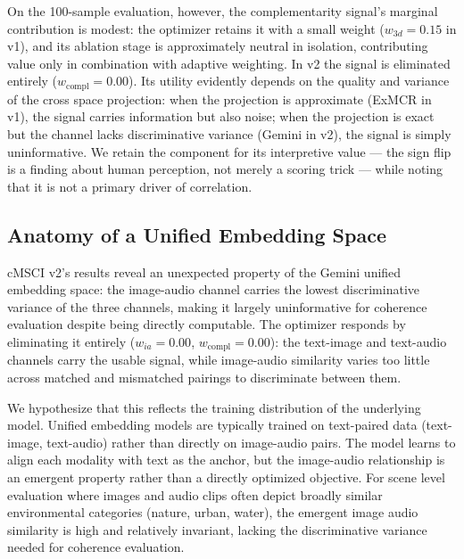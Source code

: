 On the 100-sample evaluation, however, the complementarity signal's marginal contribution is modest: the optimizer retains it with a small weight ($w_{3d} = 0.15$ in v1), and its ablation stage is approximately neutral in isolation, contributing value only in combination with adaptive weighting. In v2 the signal is eliminated entirely ($w_{\mathrm{compl}} = 0.00$). Its utility evidently depends on the quality and variance of the cross space projection: when the projection is approximate (ExMCR in v1), the signal carries information but also noise; when the projection is exact but the channel lacks discriminative variance (Gemini in v2), the signal is simply uninformative. We retain the component for its interpretive value — the sign flip is a finding about human perception, not merely a scoring trick — while noting that it is not a primary driver of correlation.

\subsection{Anatomy of a Unified Embedding Space}\label{sec:anatomy-unified}

cMSCI v2's results reveal an unexpected property of the Gemini unified embedding space: the image-audio channel carries the lowest discriminative variance of the three channels, making it largely uninformative for coherence evaluation despite being directly computable. The optimizer responds by eliminating it entirely ($w_{ia} = 0.00$, $w_{\mathrm{compl}} = 0.00$): the text-image and text-audio channels carry the usable signal, while image-audio similarity varies too little across matched and mismatched pairings to discriminate between them.

We hypothesize that this reflects the training distribution of the underlying model. Unified embedding models are typically trained on text-paired data (text-image, text-audio) rather than directly on image-audio pairs. The model learns to align each modality with text as the anchor, but the image-audio relationship is an emergent property rather than a directly optimized objective. For scene level evaluation where images and audio clips often depict broadly similar environmental categories (nature, urban, water), the emergent image audio similarity is high and relatively invariant, lacking the discriminative variance needed for coherence evaluation.

